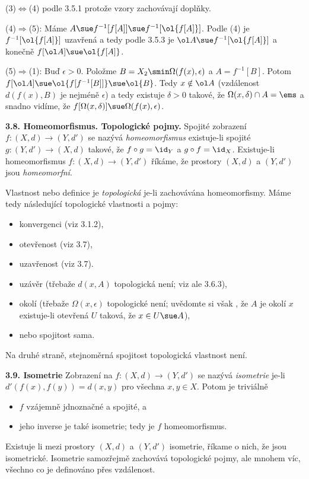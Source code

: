 \documentclass[12pt]{article}
\begin{document}
{  (3)$\Leftrightarrow$(4) podle 3.5.1 protože vzory zachovávají doplňky.
  
  (4)$\Rightarrow$(5): Máme $A\sue f^{-1}[f[A]]\sue f^{-1}[\ol{f[A]}]$. Podle (4) je 
  $f^{-1}[\ol{f[A]}]$ uzavřená a tedy podle 3.5.3 je $\ol A\sue f^{-1}[\ol{f[A]}]$ a konečně
  $f[\ol A]\sue \ol{f[A]}$.
  
  (5)$\Rightarrow$(1): Buď $\epsilon>0$. Položme $B=X_2\smin\Omega(f(x),\epsilon)$ a $A=f^{-1}[B]$.
  Potom $f[\ol A]\sue \ol {f[f^{-1}[B]]}\sue
  \ol {B}$. Tedy $x\notin\ol A$ (vzdálenost $d(f(x),B)$ je nejméně $\epsilon$) a tedy existuje $\delta>0$ takové, že $\Omega(x,\delta)\cap A=\ems$ a snadno vidíme, že $f[\Omega(x,\delta)]\sue\Omega(f(x),\epsilon)$.\sq
  
  \bigskip
  
  {\bf 3.8. Homeomorfismus. Topologické pojmy.} Spojité zobrazení
  $f:(X,d)\to (Y,d')$ se nazývá {\em homeomorfismus} existuje-li spojité $g:(Y,d')\to (X,d)$ takové, že $f\circ g=\id_Y$ a $g\circ f=\id _X$. Existuje-li homeomorfismus $f:(X,d)\to (Y,d')$ říkáme, že prostory $(X,d)$ a $(Y,d')$  jsou {\em homeomorfní}.
  
  Vlastnost nebo definice je {\em topologická} je-li zachovávána homeomorfismy. Máme tedy následující topologické vlastnosti a pojmy:
  \begin{itemize}
  \item konvergenci (viz 3.1.2),
  \item otevřenost (viz 3.7),
  \item uzavřenost (viz 3.7).
  \item uzávěr  (třebaže $d(x,A)$ topologická není; viz ale 3.6.3),
  \item okolí (třebaže $\Omega(x,\epsilon)$ topologické není; uvědomte si však , že $A$ je okolí $x$ existuje-li  otevřená $U$ taková, že $x\in U\sue A$),
  \item nebo spojitost sama.
  \end{itemize}
  Na druhé straně, stejnoměrná spojitost topologická vlastnost není.
  
   
  \bigskip
  
  {\bf 3.9. Isometrie} Zobrazení na 
  $f:(X,d)\to (Y,d')$ se nazývá  {\em isometrie} je-li $d'(f(x),f(y))=d(x,y)$ pro všechna $x,y\in X$. Potom je triviálně
  \begin{itemize}
  \item $f$ vzájemně jdnoznačné a spojité, a
  \item jeho inverse je také isometrie; tedy je $f$  homeomorfismus.
  \end{itemize}
  Existuje li mezi prostory  $(X,d)$ a $(Y,d')$ isometrie, říkame o nich, že jsou isometrické. Isometrie samozřejmě zachovává
   topologické pojmy, ale mnohem víc, všechno co je definováno přes vzdálenost.
  
}
\end{document}
